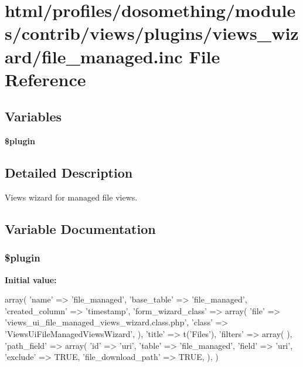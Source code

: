\hypertarget{file__managed_8inc}{
\section{html/profiles/dosomething/modules/contrib/views/plugins/views\_\-wizard/file\_\-managed.inc File Reference}
\label{file__managed_8inc}
}
\subsection*{Variables}
\begin{DoxyCompactItemize}
\item 
{\bfseries \$plugin}
\end{DoxyCompactItemize}


\subsection{Detailed Description}
Views wizard for managed file views. 

\subsection{Variable Documentation}
\hypertarget{file__managed_8inc_ada8a7130088351710bb02ed622d6bf65}{
\subsubsection[{\$plugin}]{\setlength{\rightskip}{0pt plus 5cm}\$plugin}}
\label{file__managed_8inc_ada8a7130088351710bb02ed622d6bf65}
{\bfseries Initial value:}
\begin{DoxyCode}
 array(
  'name' => 'file_managed',
  'base_table' => 'file_managed',
  'created_column' => 'timestamp',
  'form_wizard_class' => array(
    'file' => 'views_ui_file_managed_views_wizard.class.php',
    'class' => 'ViewsUiFileManagedViewsWizard',
  ),
  'title' => t('Files'),
  'filters' => array(
  ),
  'path_field' => array(
    'id' => 'uri',
    'table' => 'file_managed',
    'field' => 'uri',
    'exclude' => TRUE,
    'file_download_path' => TRUE,
  ),
)
\end{DoxyCode}
